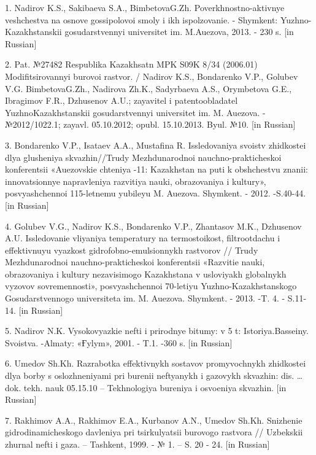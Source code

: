 \begin{noparindent}
1.
  Nadirov K.S., Sakibaeva S.A., BimbetovaG.Zh. Poverkhnostno-aktivnye
  veshchestva na osnove gossipolovoi smoly i ikh
  ispol\textquotesingle zovanie. - Shymkent: Yuzhno-Kazakhstanskii
  gosudarstvennyi universitet im. M.Auezova, 2013. - 230 s. {[}in
  Russian{]}

2.
  Pat. №27482 Respublika Kazakhsatn MPK S09K 8/34 (2006.01)
  Modifitsirovannyi burovoi rastvor. / Nadirov K.S., Bondarenko V.P.,
  Golubev V.G. BimbetovaG.Zh., Nadirova Zh.K., Sadyrbaeva A.S.,
  Orymbetova G.E., Ibragimov F.R., Dzhusenov A.U.;
  zayavitel\textquotesingle{} i patentoobladatel\textquotesingle{}
  YuzhnoKazakhstanskii gosudarstvennyi universitet im. M. Auezova.
  -№2012/1022.1; zayavl. 05.10.2012; opubl. 15.10.2013. Byul. №10. {[}in
  Russian{]}

3.
  Bondarenko V.P., Isataev A.A., Mustafina R. Issledovaniya svoistv
  zhidkostei dlya glusheniya skvazhin//Trudy Mezhdunarodnoi
  nauchno-prakticheskoi konferentsii «Auezovskie chteniya -11:
  Kazakhstan na puti k obshchestvu znanii: innovatsionnye napravleniya
  razvitiya nauki, obrazovaniya i kul\textquotesingle tury»,
  posvyashchennoi 115-letnemu yubileyu M. Auezova. Shymkent. - 2012.
  -S.40-44. {[}in Russian{]}

4.
  Golubev V.G., Nadirov K.S., Bondarenko V.P., Zhantasov M.K., Dzhusenov
  A.U. Issledovanie vliyaniya temperatury na
  termostoikost\textquotesingle, fil\textquotesingle trootdachu i
  effektivnuyu vyazkost\textquotesingle{}
  gidrofobno-emul\textquotesingle sionnykh rastvorov // Trudy
  Mezhdunarodnoi nauchno-prakticheskoi konferentsii «Razvitie nauki,
  obrazovaniya i kul\textquotesingle tury nezavisimogo Kazakhstana v
  usloviyakh global\textquotesingle nykh vyzovov sovremennosti»,
  posvyashchennoi 70-letiyu Yuzhno-Kazakhstanskogo Gosudarstvennogo
  universiteta im. M. Auezova. Shymkent. - 2013. -T. 4. - S.11-14. {[}in
  Russian{]}

5.
  Nadirov N.K. Vysokovyazkie nefti i prirodnye bitumy: v 5 t:
  Istoriya.Basseiny. Svoistva. -Almaty: «Ғylym», 2001. - T.1. -360 s.
  {[}in Russian{]}

6. Umedov Sh.Kh. Razrabotka effektivnykh sostavov promyvochnykh
zhidkostei dlya bor\textquotesingle by s oslozhneniyami pri burenii
neftyanykh i gazovykh skvazhin: dis. \ldots{} dok. tekh. nauk 05.15.10
-- Tekhnologiya bureniya i osvoeniya skvazhin. {[}in Russian{]}

7. Rakhimov A.A., Rakhimov E.A., Kurbanov A.N., Umedov Sh.Kh. Snizhenie
gidrodinamicheskogo davleniya pri tsirkulyatsii burovogo rastvora //
Uzbekskii zhurnal nefti i gaza. -- Tashkent, 1999. - № 1. -- S. 20 - 24.
{[}in Russian{]}


\end{noparindent}
